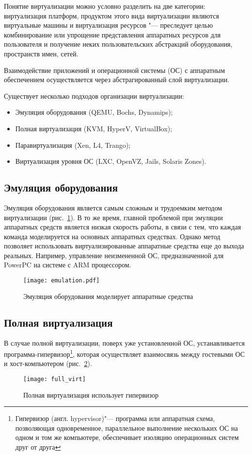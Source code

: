 Понятие виртуализации можно условно разделить на две категории: виртуализация платформ, продуктом этого вида виртуализации являются
виртуальные машины и виртуализация ресурсов "--- преследует целью комбинирование или упрощение представления аппаратных ресурсов для пользователя и получение неких пользовательских абстракций оборудования, пространств имен, сетей.

Взаимодействие приложений и операционной системы (ОС) с аппаратным обеспечением осуществляется через абстрагированный слой виртуализации. 

Существует несколько подходов организации виртуализации:
\begin{itemize}
    \item Эмуляция оборудования (QEMU, Bochs, Dynamips);
    \item Полная виртуализация (KVM, HyperV, VirtualBox);
    \item Паравиртуализация (Xen, L4, Trango);
    \item Виртуализация уровня ОС (LXC, OpenVZ, Jails, Solaris Zones).
\end{itemize}

\subsection{Эмуляция оборудования}
Эмуляция оборудования является самым сложным и трудоемким методом виртуализации (рис.~\ref{pic:emulation}).
В то же время, главной проблемой при эмуляции аппаратных средств является низкая скорость работы, в связи с тем, что каждая команда моделируется на основных аппаратных средствах.
Однако метод позволяет использовать виртуализированные аппаратные средства еще до выхода реальных.
Например, управление неизмененной ОС, предназначенной для PowerPC на системе с ARM процессором.
\begin{figure}[ht]
    \centering
	\texttt{[image: emulation.pdf]}
	\caption{Эмуляция оборудования моделирует аппаратные средства}\label{pic:emulation}
\end{figure}

\subsection{Полная виртуализация}
В случае полной виртуализации, поверх уже установленной ОС, устанавливается программа-гипервизор\footnote{Гипервизор (англ. hypervisor)"--- программа или аппаратная схема, позволяющая одновременное, параллельное выполнение нескольких ОС на одном и том же компьютере, обеспечивает изоляцию операционных систем друг от друга}, которая осуществляет взаимосвязь между гостевыми ОС и хост-компьютером (рис.~\ref{pic:full_virt}).
\begin{figure}[ht]
    \centering
	\texttt{[image: full\_virt]}
	\caption{Полная виртуализация использует гипервизор}\label{pic:full_virt}
\end{figure}

